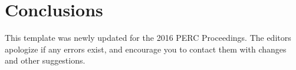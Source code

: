 \documentclass[english,aps,pra,reprint,noshowpacs,superscriptaddress]{revtex4-1}
\begin{document}
\section{Conclusions}
This template was newly updated for the 2016 PERC Proceedings.  The
editors apologize if any errors exist, and encourage you to contact
them with changes and other suggestions.  \cite{manogue2001paradigms}


\end{document}
